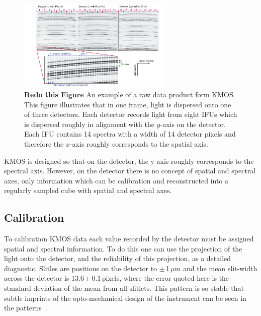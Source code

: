 \begin{figure}
 \centering
 \includegraphics[width=0.65\textwidth]{kmos/kmos-data-Davies13}
 \caption[An example of KMOS raw data]{\textbf{Redo this Figure} An example of a raw data product form KMOS. This figure  illustrates that in one frame, light is dispersed onto one of three detectors.
 Each detector records light from eight IFUs which is dispersed roughly in alignment with the $y$-axis on the detector.
 Each IFU contains 14 spectra with a width of 14 detector pixels and therefore the $x$-axis roughly corresponds to the spatial axis.\label{fig:kmosdata}}
\end{figure}

KMOS is designed so that on the detector, the y-axis roughly corresponds to the spectral axis.
However, on the detector there is no concept of spatial and spectral axes,
only information which can be calibration and reconstructed into a regularly sampled cube with spatial and spectral axes.


\subsection{Calibration} %
\label{sub:calibration}

To calibration KMOS data each value recorded by the detector must be assigned spatial and spectral information.
To do this one can use the projection of the light onto the detector, and the reliability of this projection, as a detailed diagnostic.
Slitles are positions on the detector to $\pm$\,1\,$\mu$m
\citep[roughly 1/18$^{\rm th}$ of a pixel;][]{2013A&A...558A..56D} and
the mean slit-width across the detector is 13.6\,$\pm$\,0.1\,pixels,
where the error quoted here is the standard deviation of the mean from all slitlets.
This pattern is so stable that subtle imprints of the opto-mechanical design of the instrument can be seen in the patterns~\citep[see Fig. 2 of ][]{2013A&A...558A..56D}.

